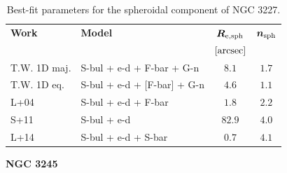 \documentclass[preprint2]{emulateapj}
\begin{document}
  \begin{table}[h]
  \small
  \caption{Best-fit parameters for the spheroidal component of NGC 3227.}
  \begin{center}
  \begin{tabular}{llcc}
  \hline
  {\bf Work} & {\bf Model}   & $\bm R_{\rm e,sph}$    & $\bm n_{\rm sph}$ \\
    &  &  $[\rm arcsec]$ & \\
  \hline
  T.W. 1D maj. & S-bul + e-d + F-bar + G-n   & $8.1$  &  $1.7$ \\
  T.W. 1D eq.  & S-bul + e-d + [F-bar] + G-n & $4.6$  &  $1.1$ \\
  \hline
  L+04         & S-bul + e-d + F-bar & $1.8$  &  $2.2$ \\
  S+11         & S-bul + e-d	     & $82.9$ &  $4.0$ \\
  L+14         & S-bul + e-d + S-bar & $0.7$  &  $4.1$ \\
  \hline
  \end{tabular}
  \end{center}
  \label{tab:n3227}
  \end{table}

  \clearpage\newpage\noindent
  {\bf NGC 3245 \\}
\end{document}
